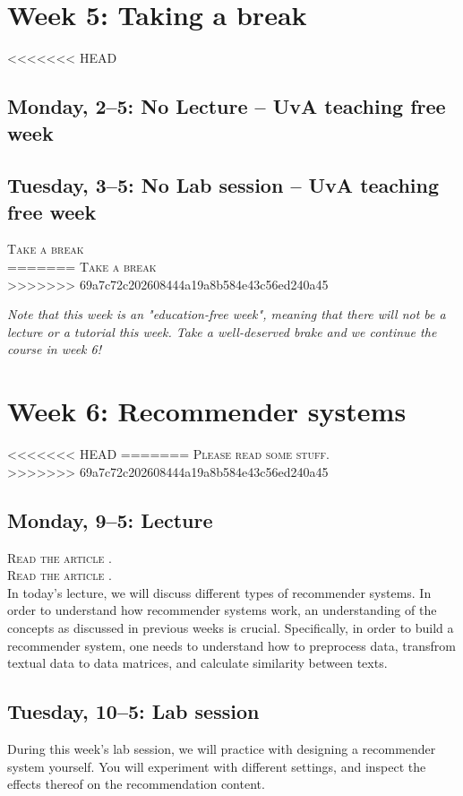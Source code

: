 \section*{Week 5: Taking a break}
<<<<<<< HEAD

\subsection*{Monday, 2--5: No Lecture -- UvA teaching free week}

\subsection*{Tuesday, 3--5: No Lab session -- UvA teaching free week}

\textsc{ Take a break}\\
=======
\textsc{Take a break}\\
>>>>>>> 69a7c72c202608444a19a8b584e43c56ed240a45

\emph{Note that this week is an "education-free week", meaning that there will not be a lecture or a tutorial this week. Take a well-deserved brake and we continue the course in week 6!}

\section*{Week 6: Recommender systems}
<<<<<<< HEAD
=======
\textsc{Please read some stuff.}\\
>>>>>>> 69a7c72c202608444a19a8b584e43c56ed240a45

\subsection*{Monday, 9--5: Lecture}
\textsc{ Read the article \cite{Moller2018}.}\\
\textsc{ Read the article \cite{Loecherbach2020}.}\\
In today's lecture, we will discuss different types of recommender systems. In order to understand how recommender systems work, an understanding of the concepts as discussed in previous weeks is crucial. Specifically, in order to build a recommender system, one needs to understand how to preprocess data, transfrom textual data to data matrices, and calculate similarity between texts. 

\subsection*{Tuesday, 10--5: Lab session}
During this week's lab session, we will practice with designing a recommender system yourself. You will experiment with different settings, and inspect the effects thereof on the recommendation content. 

